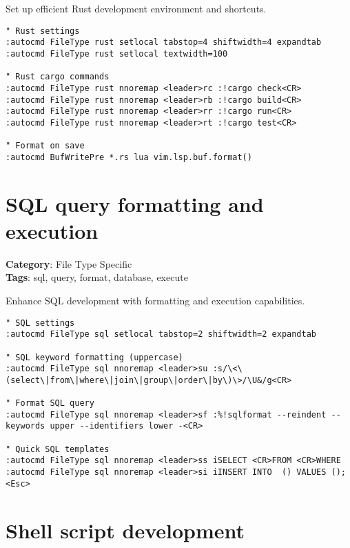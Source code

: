 {{{{{{Set up efficient Rust development environment and shortcuts.

\begin{Exa*}{}
\begin{Verbatim}[fontsize=\footnotesize, breaklines, breakanywhere]
" Rust settings
:autocmd FileType rust setlocal tabstop=4 shiftwidth=4 expandtab
:autocmd FileType rust setlocal textwidth=100

" Rust cargo commands
:autocmd FileType rust nnoremap <leader>rc :!cargo check<CR>
:autocmd FileType rust nnoremap <leader>rb :!cargo build<CR>
:autocmd FileType rust nnoremap <leader>rr :!cargo run<CR>
:autocmd FileType rust nnoremap <leader>rt :!cargo test<CR>

" Format on save
:autocmd BufWritePre *.rs lua vim.lsp.buf.format()
\end{Verbatim}
\end{Exa*}

\section{SQL query formatting and execution}

\textbf{Category}: File Type Specific\\ \textbf{Tags}: sql, query, format, database, execute
\vspace{0.5cm}

Enhance SQL development with formatting and execution capabilities.

\begin{Exa*}{}
\begin{Verbatim}[fontsize=\footnotesize, breaklines, breakanywhere]
" SQL settings
:autocmd FileType sql setlocal tabstop=2 shiftwidth=2 expandtab

" SQL keyword formatting (uppercase)
:autocmd FileType sql nnoremap <leader>su :s/\<\(select\|from\|where\|join\|group\|order\|by\)\>/\U&/g<CR>

" Format SQL query
:autocmd FileType sql nnoremap <leader>sf :%!sqlformat --reindent --keywords upper --identifiers lower -<CR>

" Quick SQL templates
:autocmd FileType sql nnoremap <leader>ss iSELECT <CR>FROM <CR>WHERE 
:autocmd FileType sql nnoremap <leader>si iINSERT INTO  () VALUES ();<Esc>
\end{Verbatim}
\end{Exa*}

\section{Shell script development}

}}}}}}
